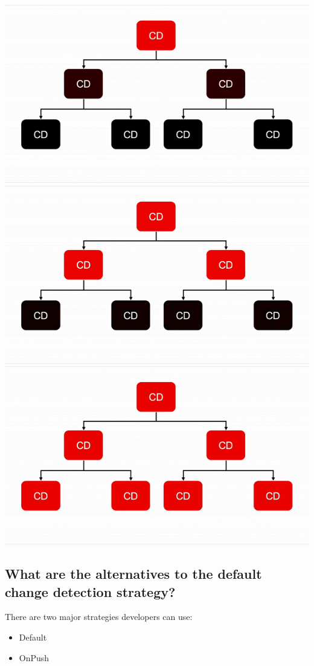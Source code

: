 \begin{enumerate}
\includegraphics[width=\linewidth]{cycle2.png}
\includegraphics[width=\linewidth]{cycle3.png}
\includegraphics[width=\linewidth]{cycle4.png}
	\autocite{Hoffmann2019}
\end{enumerate}


\subsection{What are the alternatives to the default change detection strategy?}
\label{sec:change_detection_strategies}
There are two major strategies developers can use:
\begin{itemize}
	\item Default
	\item OnPush
\end{itemize}

